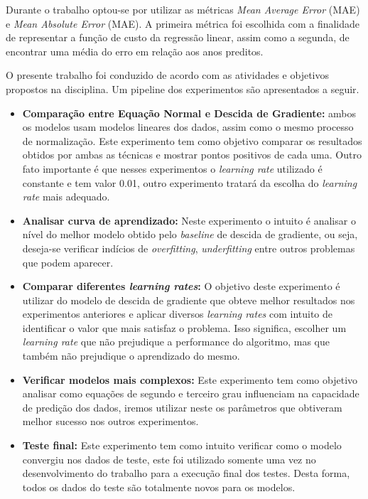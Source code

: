 \documentclass[conference]{IEEEtran}
\begin{document}

Durante o trabalho optou-se por utilizar as métricas \emph{Mean Average Error} (MAE) e \emph{Mean Absolute Error} (MAE). A primeira métrica foi escolhida com a finalidade de representar a função de custo da regressão linear, assim como a segunda, de encontrar uma média do erro em relação aos anos preditos.

O presente trabalho foi conduzido de acordo com as atividades e objetivos propostos na disciplina. Um pipeline dos experimentos são apresentados a seguir.

\begin{itemize}
	\item \textbf{Comparação entre Equação Normal e Descida de Gradiente: } ambos os modelos usam modelos lineares dos dados, assim como o mesmo processo de normalização. Este experimento tem como objetivo comparar os resultados obtidos por ambas as técnicas e mostrar pontos positivos de cada uma. Outro fato importante é que nesses experimentos o \emph{learning rate} utilizado é constante e tem valor 0.01, outro experimento tratará da escolha do \emph{learning rate} mais adequado.
	\item \textbf{Analisar curva de aprendizado: } Neste experimento o intuito é analisar o nível do melhor modelo obtido pelo \emph{baseline} de descida de gradiente, ou seja, deseja-se verificar indícios de \emph{overfitting}, \emph{underfitting} entre outros problemas que podem aparecer.
	\item \textbf{Comparar diferentes \emph{learning rates}: } O objetivo deste experimento é utilizar do modelo de descida de gradiente que obteve melhor resultados nos experimentos anteriores e aplicar diversos \emph{learning rates} com intuito de identificar o valor que mais satisfaz o problema. Isso significa, escolher um \emph{learning rate} que não prejudique a performance do algoritmo, mas que também não prejudique o aprendizado do mesmo.
	\item \textbf{Verificar modelos mais complexos: } Este experimento tem como objetivo analisar como equações de segundo e terceiro grau influenciam na capacidade de predição dos dados, iremos utilizar neste os parâmetros que obtiveram melhor sucesso nos outros experimentos.
	\item \textbf{Teste final: } Este experimento tem como intuito verificar como o modelo convergiu nos dados de teste, este foi utilizado somente uma vez no desenvolvimento do trabalho para a execução final dos testes. Desta forma, todos os dados do teste são totalmente novos para os modelos.
\end{itemize}
\end{document}
